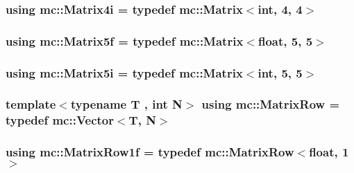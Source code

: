 \subsubsection[{\texorpdfstring{Matrix4i}{Matrix4i}}]{\setlength{\rightskip}{0pt plus 5cm}using {\bf mc\+::\+Matrix4i} = typedef {\bf mc\+::\+Matrix}$<${\bf int}, 4, 4$>$}\hypertarget{namespacemc_a2b5b12e5123fac956ab87c789991537e}{}\label{namespacemc_a2b5b12e5123fac956ab87c789991537e}
\subsubsection[{\texorpdfstring{Matrix5f}{Matrix5f}}]{\setlength{\rightskip}{0pt plus 5cm}using {\bf mc\+::\+Matrix5f} = typedef {\bf mc\+::\+Matrix}$<$float, 5, 5$>$}\hypertarget{namespacemc_ab12faae3cb1ef53b80a57c8586134343}{}\label{namespacemc_ab12faae3cb1ef53b80a57c8586134343}
\subsubsection[{\texorpdfstring{Matrix5i}{Matrix5i}}]{\setlength{\rightskip}{0pt plus 5cm}using {\bf mc\+::\+Matrix5i} = typedef {\bf mc\+::\+Matrix}$<${\bf int}, 5, 5$>$}\hypertarget{namespacemc_ae1c885363bd63ce278b21e95350ca637}{}\label{namespacemc_ae1c885363bd63ce278b21e95350ca637}
\subsubsection[{\texorpdfstring{Matrix\+Row}{MatrixRow}}]{\setlength{\rightskip}{0pt plus 5cm}template$<$typename T , int N$>$ using {\bf mc\+::\+Matrix\+Row} = typedef {\bf mc\+::\+Vector}$<$T, N$>$}\hypertarget{namespacemc_a864ada9f6799e62e26d4b02bbd1ac4c2}{}\label{namespacemc_a864ada9f6799e62e26d4b02bbd1ac4c2}
\subsubsection[{\texorpdfstring{Matrix\+Row1f}{MatrixRow1f}}]{\setlength{\rightskip}{0pt plus 5cm}using {\bf mc\+::\+Matrix\+Row1f} = typedef {\bf mc\+::\+Matrix\+Row}$<$float, 1$>$}\hypertarget{namespacemc_a5a0f82f5a673329409088bb9dd2d7f7b}{}\label{namespacemc_a5a0f82f5a673329409088bb9dd2d7f7b}
